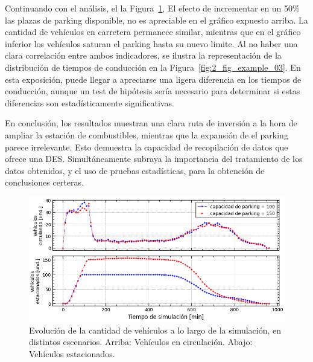 Continuando con el análisis, el la Figura~\ref{fig:2_fig_example_02},
El efecto de incrementar en un 50\% las plazas de parking disponible,
no es apreciable en el gráfico expuesto arriba.
La cantidad de vehículos en carretera permanece similar,
mientras que en el gráfico inferior los vehículos saturan el parking hasta su nuevo limite.
Al no haber una clara correlación entre ambos indicadores,
se ilustra la representación de la distribución de tiempos de conducción
en la Figura~\ref{fig:2_fig_example_03}.
En esta exposición, puede llegar a apreciarse una ligera diferencia en los tiempos de conducción,
aunque un test de hipótesis sería necesario
para determinar si estas diferencias son estadísticamente significativas.

En conclusión, los resultados muestran una clara ruta de inversión
a la hora de ampliar la estación de combustibles,
mientras que la expansión de el parking parece irrelevante.
Esto demuestra la capacidad de recopilación de datos que ofrece una DES.
Simultáneamente subraya la importancia del tratamiento de los datos obtenidos,
y el uso de pruebas estadísticas, para la obtención de conclusiones certeras.

\begin{figure}
	\begin{center}
		\includegraphics[width=\textwidth]{fig/2_fig_example_02}
	\end{center}
	\caption{Evolución de la cantidad de vehículos a lo largo de la simulación, en distintos escenarios. Arriba: Vehículos en circulación. Abajo: Vehículos estacionados.}
	\label{fig:2_fig_example_02}
\end{figure}

